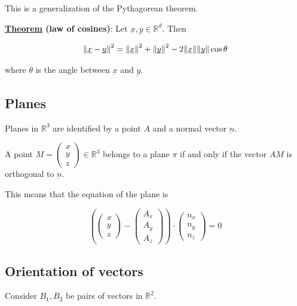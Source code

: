 \documentclass[10pt]{extarticle}
\newcommand{\R}{\mathbb{R}}
\newcommand{\munderbar}[1]{\underbar{\ensuremath{#1}}}
\begin{document}
This is a generalization of the Pythagorean theorem.

\textbf{\underline{Theorem} (law of cosines)}: Let $\munderbar{x}, \munderbar{y} \in \R^d$. Then

$$
    \norm{\munderbar{x} - \munderbar{y}}^2 = \norm{\munderbar{x}}^2 + \norm{\munderbar{y}}^2 - 2 \norm{\munderbar{x}} \norm{\munderbar{y}} \cos \theta
$$

where $\theta$ is the angle between $\munderbar{x}$ and $\munderbar{y}$.

\subsection{Planes}

Planes in $\R^3$ are identified by a point $A$ and a normal vector $\munderbar{n}$.

A point $M = \begin{pmatrix}
        x \\ y \\ z
    \end{pmatrix} \in \R^3$ belongs to a plane $\pi$ if and only if the vector $AM$ is orthogonal to $\munderbar{n}$.

This means that the equation of the plane is

$$
    \left(
    \begin{pmatrix}
            x \\ y \\ z
        \end{pmatrix} - \begin{pmatrix}
            A_x \\ A_y \\ A_z
        \end{pmatrix}
    \right)
    \cdot
    \begin{pmatrix}
        n_x \\ n_y \\ n_z
    \end{pmatrix}
    = 0
$$

\subsection{Orientation of vectors}

Consider $B_1, B_2$ be pairs of vectors in $\R^2$.

\begin{center}

    \label{fig:orientation_of_vectors}
\end{center}
\end{document}
